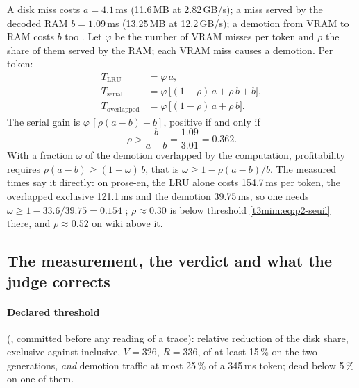 A disk miss costs $a = 4.1$\,ms (11.6\,MB at 2.82\,GB/s); a miss served by the decoded RAM $b = 1.09$\,ms (13.25\,MB at 12.2\,GB/s); a demotion from VRAM to RAM costs $b$ too \calc. Let $\varphi$ be the number of VRAM misses per token and $\rho$ the share of them served by the RAM; each VRAM miss causes a demotion. Per token:
\begin{align}
T_{\text{LRU}} &= \varphi\,a, \nonumber\\
T_{\text{serial}} &= \varphi\,\bigl[(1-\rho)\,a + \rho\,b + b\bigr], \nonumber\\
T_{\text{overlapped}} &= \varphi\,\bigl[(1-\rho)\,a + \rho\,b\bigr]. \label{t3mim:eq:p2-cout}
\end{align}
The serial gain is $\varphi\,[\rho(a-b) - b]$, positive if and only if
\begin{equation}\label{t3mim:eq:p2-seuil}
\rho > \frac{b}{a-b} = \frac{1.09}{3.01} = 0.362 .
\end{equation}
With a fraction $\omega$ of the demotion overlapped by the computation, profitability requires $\rho(a-b) \ge (1-\omega)\,b$, that is $\omega \ge 1 - \rho(a-b)/b$. The measured times say it directly: on prose-en, the LRU alone costs 154.7\,ms per token, the overlapped exclusive 121.1\,ms and the demotion 39.75\,ms, so one needs $\omega \ge 1 - 33.6/39.75 = 0.154$ \calc; $\rho \approx 0.30$ is below threshold \eqref{t3mim:eq:p2-seuil} there, and $\rho \approx 0.52$ on wiki above it.

\subsection{The measurement, the verdict and what the judge corrects}\label{t3mim:sec:p2-verdict}

\paragraph{Declared threshold} (, committed before any reading of a trace): relative reduction of the disk share, exclusive against inclusive, $V = 326$, $R = 336$, of at least 15\,\% on the two generations, \emph{and} demotion traffic at most 25\,\% of a 345\,ms token; dead below 5\,\% on one of them.

